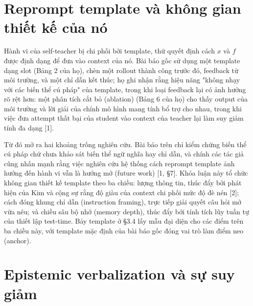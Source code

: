 \section{Reprompt template và không gian thiết kế của nó}\label{the-reprompt-template-and-its-design-space}

Hành vi của self-teacher bị chi phối bởi template, thứ quyết định cách \(x\) và \(f\) được định dạng để đưa vào context của nó. Bài báo gốc sử dụng một template dạng slot (Bảng 2 của họ), chèn một rollout thành công trước đó, feedback từ môi trường, và một chỉ dẫn kết thúc; họ ghi nhận rằng hiệu năng "không nhạy với các biến thể cú pháp" của template, trong khi loại feedback lại có ảnh hưởng rõ rệt hơn: một phân tích cắt bỏ (ablation) (Bảng 6 của họ) cho thấy output của môi trường và lời giải của chính mô hình mang tính bổ trợ cho nhau, trong khi việc đưa attempt thất bại của student vào context của teacher lại làm suy giảm tính đa dạng {[}1{]}.

Từ đó mở ra hai khoảng trống nghiên cứu. Bài báo trên chỉ kiểm chứng biến thể cú pháp chứ chưa khảo sát biến thể ngữ nghĩa hay chỉ dẫn, và chính các tác giả cũng nhấn mạnh rằng việc nghiên cứu hệ thống cách reprompt template ảnh hưởng đến hành vi vẫn là hướng mở (future work) {[}1, §7{]}. Khóa luận này tổ chức không gian thiết kế template theo ba chiều: lượng thông tin, thúc đẩy bởi phát hiện của Kim và cộng sự rằng độ giàu của context chi phối mức độ đè nén {[}2{]}; cách đóng khung chỉ dẫn (instruction framing), trực tiếp giải quyết câu hỏi mở vừa nêu; và chiều sâu bộ nhớ (memory depth), thúc đẩy bởi tính tích lũy tuần tự của thiết lập test-time. Bảy template ở §3.4 lấy mẫu đại diện cho các điểm trên ba chiều này, với template mặc định của bài báo gốc đóng vai trò làm điểm neo (anchor).

\section{Epistemic verbalization và sự suy giảm}\label{epistemic-verbalization-and-suppression}

